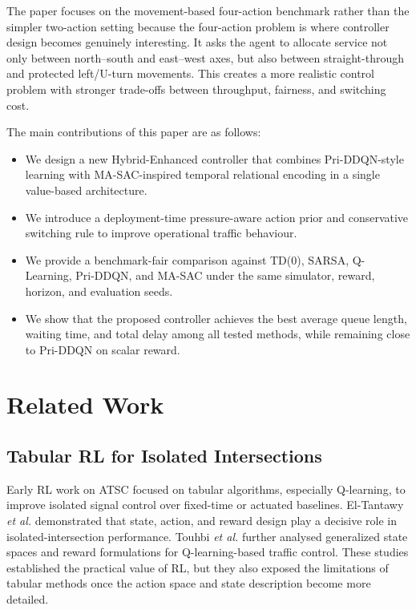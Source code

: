 \documentclass[conference]{IEEEtran}
\begin{document}
The paper focuses on the movement-based four-action benchmark rather
than the simpler two-action setting because the four-action problem
is where controller design becomes genuinely interesting. It asks the
agent to allocate service not only between north--south and
east--west axes, but also between straight-through and protected
left/U-turn movements. This creates a more realistic control problem
with stronger trade-offs between throughput, fairness, and switching
cost.

The main contributions of this paper are as follows:
\begin{itemize}
\item We design a new Hybrid-Enhanced controller that combines
Pri-DDQN-style learning with MA-SAC-inspired temporal relational
encoding in a single value-based architecture.
\item We introduce a deployment-time pressure-aware action prior and
conservative switching rule to improve operational traffic behaviour.
\item We provide a benchmark-fair comparison against TD(0), SARSA,
Q-Learning, Pri-DDQN, and MA-SAC under the same simulator, reward,
horizon, and evaluation seeds.
\item We show that the proposed controller achieves the best average
queue length, waiting time, and total delay among all tested methods,
while remaining close to Pri-DDQN on scalar reward.
\end{itemize}

\section{Related Work}
\subsection{Tabular RL for Isolated Intersections}
Early RL work on ATSC focused on tabular algorithms, especially
Q-learning, to improve isolated signal control over fixed-time or
actuated baselines. El-Tantawy \emph{et al.}
\cite{ElTantawy2014DesignORH} demonstrated that state, action, and
reward design play a decisive role in isolated-intersection
performance. Touhbi \emph{et al.} \cite{Touhbi2017AdaptiveTSM}
further analysed generalized state spaces and reward formulations for
Q-learning-based traffic control. These studies established the
practical value of RL, but they also exposed the limitations of
tabular methods once the action space and state description become
more detailed.
\end{document}
